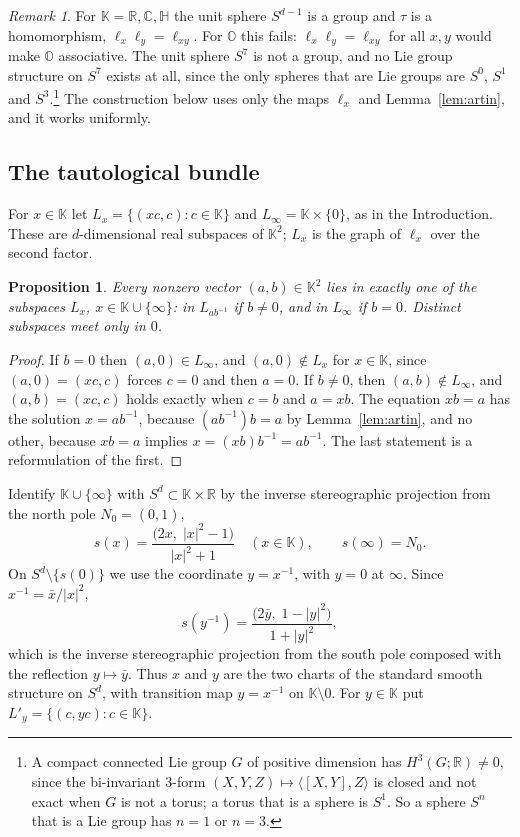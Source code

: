 \documentclass[11pt]{amsart}
\numberwithin{equation}{section}
\theoremstyle{plain}
\newtheorem{proposition}[theorem]{Proposition}
\theoremstyle{definition}
\theoremstyle{remark}
\newtheorem{remark}[theorem]{Remark}
\newcommand{\R}{\mathbb{R}}
\newcommand{\C}{\mathbb{C}}
\newcommand{\Hq}{\mathbb{H}}
\newcommand{\Oc}{\mathbb{O}}
\newcommand{\K}{\mathbb{K}}
\begin{document}
\begin{remark}\label{rem:notgroup}
For $\K=\R,\C,\Hq$ the unit sphere $S^{d-1}$ is a group and $\tau$ is a homomorphism, $\ell_x\ell_y=\ell_{xy}$. For $\Oc$ this fails: $\ell_x\ell_y=\ell_{xy}$ for all $x,y$ would make $\Oc$ associative. The unit sphere $S^7$ is not a group, and no Lie group structure on $S^7$ exists at all, since the only spheres that are Lie groups are $S^0$, $S^1$ and $S^3$.\footnote{A compact connected Lie group $G$ of positive dimension has $H^3(G;\R)\neq0$, since the bi-invariant $3$-form $(X,Y,Z)\mapsto\langle[X,Y],Z\rangle$ is closed and not exact when $G$ is not a torus; a torus that is a sphere is $S^1$. So a sphere $S^n$ that is a Lie group has $n=1$ or $n=3$.} The construction below uses only the maps $\ell_x$ and Lemma~\ref{lem:artin}, and it works uniformly.
\end{remark}

\subsection{The tautological bundle}\label{sec:taut}

For $x\in\K$ let $L_x=\{(xc,c):c\in\K\}$ and $L_\infty=\K\times\{0\}$, as in the Introduction. These are $d$-dimensional real subspaces of $\K^2$; $L_x$ is the graph of $\ell_x$ over the second factor.

\begin{proposition}\label{prop:lines}
Every nonzero vector $(a,b)\in\K^2$ lies in exactly one of the subspaces $L_x$, $x\in\K\cup\{\infty\}$: in $L_{ab^{-1}}$ if $b\neq0$, and in $L_\infty$ if $b=0$. Distinct subspaces meet only in $0$.
\end{proposition}

\begin{proof}
If $b=0$ then $(a,0)\in L_\infty$, and $(a,0)\notin L_x$ for $x\in\K$, since $(a,0)=(xc,c)$ forces $c=0$ and then $a=0$. If $b\neq0$, then $(a,b)\notin L_\infty$, and $(a,b)=(xc,c)$ holds exactly when $c=b$ and $a=xb$. The equation $xb=a$ has the solution $x=ab^{-1}$, because $(ab^{-1})b=a$ by Lemma~\ref{lem:artin}, and no other, because $xb=a$ implies $x=(xb)b^{-1}=ab^{-1}$. The last statement is a reformulation of the first.
\end{proof}

Identify $\K\cup\{\infty\}$ with $S^d\subset\K\times\R$ by the inverse stereographic projection from the north pole $N_0=(0,1)$,
\begin{equation}\label{eq:stereo}
s(x)=\frac{\bigl(2x,\;|x|^2-1\bigr)}{|x|^2+1}\quad(x\in\K),\qquad s(\infty)=N_0 .
\end{equation}
On $S^d\setminus\{s(0)\}$ we use the coordinate $y=x^{-1}$, with $y=0$ at $\infty$. Since $x^{-1}=\bar x/|x|^2$,
\begin{equation}\label{eq:stereo2}
s(y^{-1})=\frac{\bigl(2\bar y,\;1-|y|^2\bigr)}{1+|y|^2},
\end{equation}
which is the inverse stereographic projection from the south pole composed with the reflection $y\mapsto\bar y$. Thus $x$ and $y$ are the two charts of the standard smooth structure on $S^d$, with transition map $y=x^{-1}$ on $\K\setminus0$. For $y\in\K$ put $L'_y=\{(c,yc):c\in\K\}$.
\end{document}
